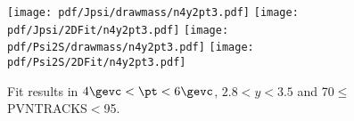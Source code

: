 \begin{figure}[H]
\begin{center}
\texttt{[image: pdf/Jpsi/drawmass/n4y2pt3.pdf]}
\texttt{[image: pdf/Jpsi/2DFit/n4y2pt3.pdf]}
\vspace*{-0.5cm}
\texttt{[image: pdf/Psi2S/drawmass/n4y2pt3.pdf]}
\texttt{[image: pdf/Psi2S/2DFit/n4y2pt3.pdf]}
\vspace*{-0.5cm}
\end{center}
\caption{Fit results in $4\gevc<\pt<6\gevc$, $2.8<y<3.5$ and 70$\leq$PVNTRACKS$<$95.}
\label{Fitn4y2pt3}
\end{figure}
